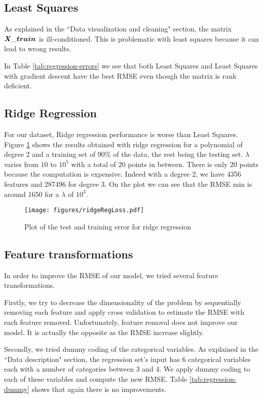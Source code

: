\documentclass{article} %
\begin{document}
\subsection{Least Squares}
As explained in the ``Data visualization and cleaning" section, the matrix $\boldmath{X\_train}$ is ill-conditioned.
This is problematic with least squares because it can lead to wrong results.

In Table \ref{tab:regression-errors} we see that both Least Squares and Least Squares with gradient descent have the best RMSE even though the matrix is rank deficient.

\subsection{Ridge Regression}

For our dataset, Ridge regression performance is worse than Least Squares.
Figure \ref{fig:ridgeRegError} shows the results obtained with ridge regression for a polynomial of degree 2 and a training set of 90\% of the data, the rest being the testing set. $\lambda$ varies from $10$ to $10^{5}$ with a total of 20 points in between. 
There is only 20 points because the computation is expensive. Indeed with a degree 2, we have 4356 features and 287496 for degree 3.
On the plot we can see that the RMSE min is around 1650 for a $\lambda$ of $10^{3}$.

\begin{figure}[!t]
	\center
	\texttt{[image: figures/ridgeRegLoss.pdf]}
	\caption{Plot of the test and training error for ridge regression}
	\label{fig:ridgeRegError}
\end{figure}


\subsection{Feature transformations}
In order to improve the RMSE of our model, we tried several feature transformations.

Firstly, we try to decrease the dimensionality of the problem by sequentially removing each feature and apply cross validation to estimate the RMSE with each feature removed.
Unfortunately, feature removal does not improve our model. It is actually the opposite as the RMSE increase slightly.

Secondly, we tried dummy coding of the categorical variables.
As explained in the ``Data description" section, the regression set's input has 6 categorical variables each with a number of categories between 3 and 4.
We apply dummy coding to each of these variables and compute the new RMSE.
Table \ref{tab:regression-dummy} shows that again there is no improvements.
\end{document}
